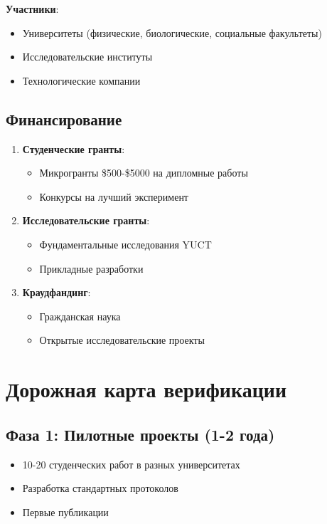 \documentclass[12pt,a4paper]{article}
\begin{document}
	\textbf{Участники}:
	\begin{itemize}
		\item Университеты (физические, биологические, социальные факультеты)
		\item Исследовательские институты
		\item Технологические компании
	\end{itemize}
	
	\subsection{Финансирование}
	
	\begin{enumerate}
		\item \textbf{Студенческие гранты}:
		\begin{itemize}
			\item Микрогранты \$500-\$5000 на дипломные работы
			\item Конкурсы на лучший эксперимент
		\end{itemize}
		
		\item \textbf{Исследовательские гранты}:
		\begin{itemize}
			\item Фундаментальные исследования YUCT
			\item Прикладные разработки
		\end{itemize}
		
		\item \textbf{Краудфандинг}:
		\begin{itemize}
			\item Гражданская наука
			\item Открытые исследовательские проекты
		\end{itemize}
	\end{enumerate}
	
	\section{Дорожная карта верификации}
	
	\subsection{Фаза 1: Пилотные проекты (1-2 года)}
	\begin{itemize}
		\item 10-20 студенческих работ в разных университетах
		\item Разработка стандартных протоколов
		\item Первые публикации
	\end{itemize}
	
\end{document}
